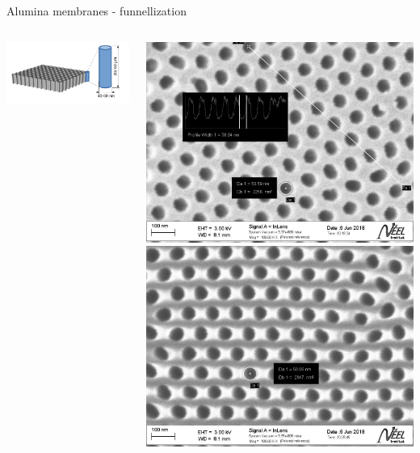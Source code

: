 \documentclass[../defence.tex]{subfiles}
\begin{document}
  \begin{frame}{Alumina membranes - funnellization}
    \begin{columns}[onlytextwidth, T]

        \includegraphics[width=\linewidth]{images/membranes.pdf}
        \pause

        \begin{columns}[onlytextwidth, T]
            \includegraphics[width=\linewidth]{images/295c__al_side.jpg}
            \includegraphics[width=\linewidth]{images/295c_sol_side.jpg}
        \end{columns}
        \pause


\end{columns}
\end{frame}
\end{document}
